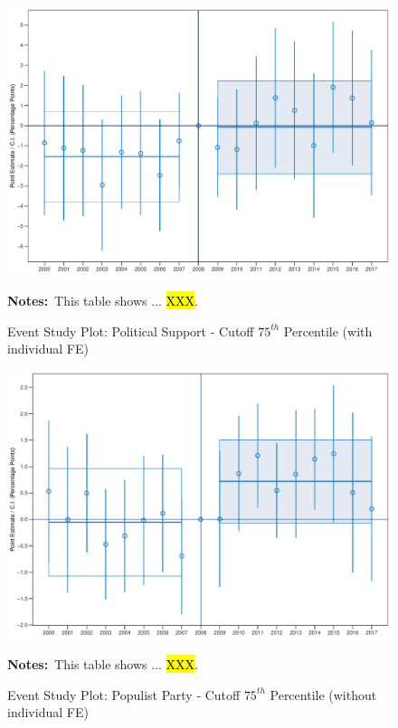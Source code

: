 \documentclass[11pt]{article}
\begin{document}
\begin{figure}[htbp!]
    \centering
    \caption{Event Study Plot: Political Support - Cutoff $75^{th}$ Percentile (with individual FE)}\label{fig:dynamic_did_cbk_past_mean_ps_p75_ife}
    \includegraphics[width=1\linewidth]{events/dynamic_did_cbk_past_mean_ps_p75_ife}
    \begin{tablenotes}
        \footnotesize
        \item \textbf{Notes:}~This table shows ... \hl{XXX}.
    \end{tablenotes} 
\end{figure}

\begin{figure}[htbp!]
    \centering
    \caption{Event Study Plot: Populist Party - Cutoff $75^{th}$ Percentile (without individual FE)}\label{fig:dynamic_did_cbk_past_mean_pp_p75_noife}
    \includegraphics[width=1\linewidth]{events/dynamic_did_cbk_past_mean_pp_p75_noife}
    \begin{tablenotes}
        \footnotesize
        \item \textbf{Notes:}~This table shows ... \hl{XXX}.
    \end{tablenotes} 
\end{figure}
\end{document}

